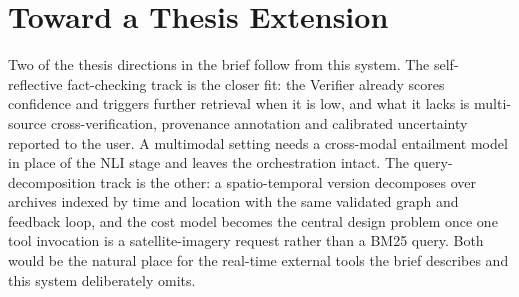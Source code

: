 \section{Toward a Thesis Extension}
\label{sec:thesis}

Two of the thesis directions in the brief follow from this system. The
self-reflective fact-checking track is the closer fit: the Verifier already
scores confidence and triggers further retrieval when it is low, and what it
lacks is multi-source cross-verification, provenance annotation and calibrated
uncertainty reported to the user. A multimodal setting needs a cross-modal
entailment model in place of the NLI stage and leaves the orchestration
intact. The query-decomposition track is the other: a spatio-temporal version
decomposes over archives indexed by time and location with the same validated
graph and feedback loop, and the cost model becomes the central design problem
once one tool invocation is a satellite-imagery request rather than a BM25
query. Both would be the natural place for the real-time external tools the
brief describes and this system deliberately omits.
